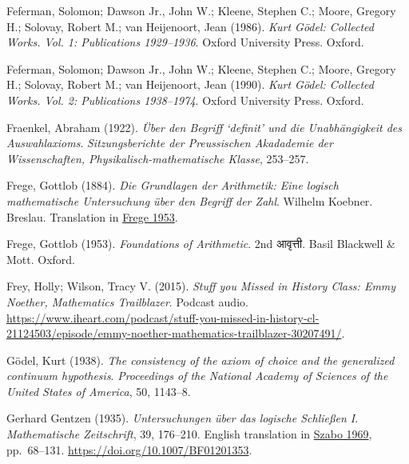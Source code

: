 \par\medskip{}\label{bib:Godel1986}
Feferman, Solomon; Dawson Jr., John W.; Kleene, Stephen C.; Moore, Gregory H.; Solovay, Robert M.; van Heijenoort, Jean (1986). \emph{Kurt G\"odel: Collected Works. Vol. 1: Publications 1929--1936}. Oxford University Press. Oxford.

\par\medskip{}\label{bib:Godel1990}
Feferman, Solomon; Dawson Jr., John W.; Kleene, Stephen C.; Moore, Gregory H.; Solovay, Robert M.; van Heijenoort, Jean (1990). \emph{Kurt G\"odel: Collected Works. Vol. 2: Publications 1938--1974}. Oxford University Press. Oxford.

\par\medskip{}\label{bib:Fraenkel1922}
Fraenkel, Abraham (1922). \emph{\"{U}ber den {Begriff} `definit' und die {Unabh\"angigkeit} des {Auswahlaxioms}}. \emph{Sitzungsberichte der Preussischen Akadademie der Wissenschaften, Physikalisch-mathematische Klasse}, 253--257.

\par\medskip{}\label{bib:Frege1884}
Frege, Gottlob (1884). \emph{Die {Grundlagen} der {Arithmetik}: Eine logisch mathematische {Untersuchung} \"{u}ber den {Begriff} der {Zahl}}. Wilhelm Koebner. Breslau. Translation in \hyperref[bib:Frege1953]{Frege 1953}.

\par\medskip{}\label{bib:Frege1953}
Frege, Gottlob (1953). \emph{Foundations of Arithmetic}. 2nd आवृत्ती. Basil Blackwell \& Mott. Oxford.

\par\medskip{}\label{bib:Frey2015}
Frey, Holly; Wilson, Tracy V. (2015). \emph{Stuff you Missed in History Class: {E}mmy {N}oether, Mathematics Trailblazer}. Podcast audio. \url{https://www.iheart.com/podcast/stuff-you-missed-in-history-cl-21124503/episode/emmy-noether-mathematics-trailblazer-30207491/}.

\par\medskip{}\label{bib:Godel1938}
G\"odel, Kurt (1938). \emph{The consistency of the axiom of choice and the generalized continuum hypothesis}. \emph{Proceedings of the National Academy of Sciences of the United States of America}, 50, 1143--8.

\par\medskip{}\label{bib:Gentzen1935a}
Gerhard Gentzen (1935). \emph{Untersuchungen \"uber das logische {S}chlie\ss en {I}}. \emph{Mathe\-mati\-sche Zeit\-schrift}, 39, 176--210. {E}nglish translation in \hyperref[bib:Gentzen1969]{Szabo 1969}, pp.~68--131. \url{https://doi.org/10.1007/BF01201353}.


